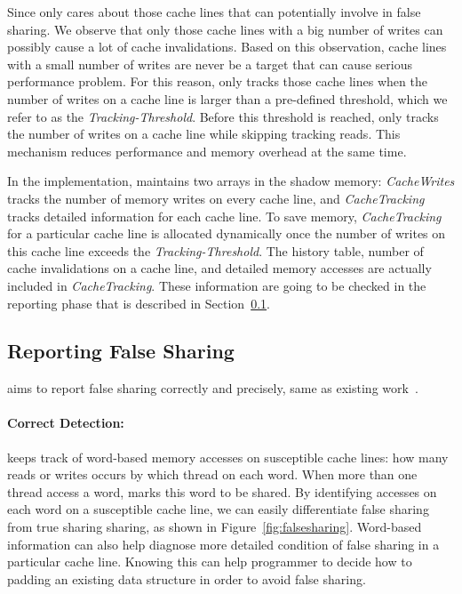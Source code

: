 Since \cheetah{} only cares about those cache lines that can potentially involve in false sharing. We observe that only those cache lines with a big number of writes can possibly cause a lot of cache invalidations. Based on this observation, cache lines with a small number of writes are never be a target that can cause serious performance problem. For this reason, \Cheetah{} only tracks those cache lines when the number of writes on a cache line is larger than a pre-defined threshold, which we refer to as the {\it Tracking-Threshold}. Before this threshold is reached, \Cheetah{} only tracks the number of writes on a cache line while skipping tracking reads. This mechanism reduces performance and memory overhead at the same time.

In the implementation, \Cheetah{} maintains two arrays in the shadow memory: {\it CacheWrites} tracks the number of memory writes on every cache line, and {\it CacheTracking} tracks detailed information for each cache line. To save memory, {\it CacheTracking} for a particular cache line is allocated dynamically once the number of writes on this cache line exceeds the {\it Tracking-Threshold}. The history table, number of cache invalidations on a cache line, and detailed memory accesses are actually included in {\it CacheTracking}. These information are going to be checked in the reporting phase that is described in Section~\ref{sec:report}.
 
 \subsection{Reporting False Sharing}
\label{sec:report}

\Cheetah{} aims to report false sharing correctly and precisely, same as existing work~\cite{sheriff, Predator}. 

\paragraph{Correct Detection:} \Cheetah{} keeps track of word-based memory accesses on susceptible cache lines: how many reads or writes occurs by which thread on each word. When more than one thread access a word, \Cheetah{} marks this word to be shared. By identifying accesses on each word on a susceptible cache line, we can easily differentiate false sharing from true sharing sharing, as shown in Figure~\ref{fig:falsesharing}. Word-based information can also help diagnose more detailed  condition of false sharing in a particular cache line. Knowing this can help programmer to decide how to padding an existing data structure in order to avoid false sharing.  

